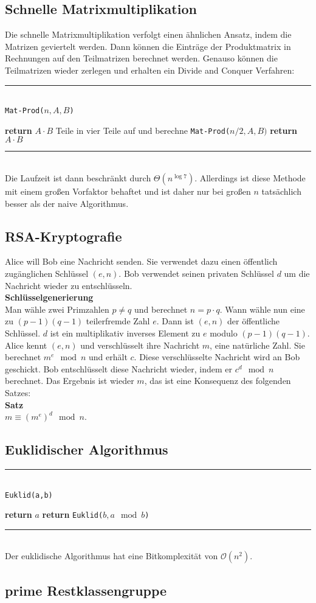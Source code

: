 \documentclass[a4paper, 12pt]{article}
\begin{document}
	\subsection{Schnelle Matrixmultiplikation}
	Die schnelle Matrixmultiplikation verfolgt einen ähnlichen Ansatz, indem die Matrizen geviertelt werden. Dann können die Einträge der Produktmatrix in Rechnungen auf den Teilmatrizen berechnet werden. Genauso können die Teilmatrizen wieder zerlegen und erhalten ein Divide and Conquer Verfahren: 
	\par\noindent\rule{\textwidth}{0.4pt}\\
	\texttt{Mat-Prod($n,A,B$)}
	\begin{algorithmic}[1]
		\State \textbf{return} $A\cdot B$
		\Else
		\State Teile in vier Teile auf und berechne \texttt{Mat-Prod($n/2, A, B)$}
		\EndIf
		\State \textbf{return} $A\cdot B$
	\end{algorithmic}
	\par\noindent\rule{\textwidth}{0.4pt}\\
	Die Laufzeit ist dann beschränkt durch $\Theta(n^{\log 7})$. Allerdings ist diese Methode mit einem großen Vorfaktor behaftet und ist daher nur bei großen $n$ tatsächlich besser als der naive Algorithmus.
	\subsection{RSA-Kryptografie}
	Alice will Bob eine Nachricht senden. Sie verwendet dazu einen öffentlich zugänglichen Schlüssel $(e,n)$. Bob verwendet seinen privaten Schlüssel $d$ um die Nachricht wieder zu entschlüsseln.\\
	\textbf{Schlüsselgenerierung}\\
	Man wähle zwei Primzahlen $p \neq q$ und berechnet $n = p \cdot q$. Wann wähle nun eine zu $(p-1)(q-1)$ teilerfremde Zahl $e$. Dann ist $(e,n)$ der öffentliche Schlüssel. $d$ ist ein multiplikativ inverses Element zu $e$ modulo $(p-1)(q-1)$.\\
	Alice kennt $(e,n)$ und verschlüsselt ihre Nachricht $m$, eine natürliche Zahl. Sie berechnet $m^e \mod n$ und erhält $c$. Diese verschlüsselte Nachricht wird an Bob geschickt. Bob entschlüsselt diese Nachricht wieder, indem er $c^d \mod n$ berechnet. Das Ergebnis ist wieder $m$, das ist eine Konsequenz des folgenden Satzes: \\
	\textbf{Satz}\\
	$m \equiv (m^e)^d \mod n$.\\
	\subsection{Euklidischer Algorithmus}
	\par\noindent\rule{\textwidth}{0.4pt}\\
	\texttt{Euklid(a,b)}
	\begin{algorithmic}[1]
		\State \textbf{return} $a$
		\Else
		\State \textbf{return} \texttt{Euklid($b, a \mod b$)}
		\EndIf
	\end{algorithmic}
	\par\noindent\rule{\textwidth}{0.4pt}\\
	Der euklidische Algorithmus hat eine Bitkomplexität von $\mathcal{O}(n^2)$.\\
	\subsection{prime Restklassengruppe}
	
\end{document}

